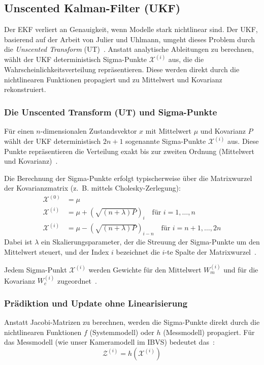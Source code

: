\subsection{Unscented Kalman-Filter (UKF)}
\label{subsec:UKF}
Der \ac{EKF} verliert an Genauigkeit, wenn Modelle stark nichtlinear sind. Der \ac{UKF}, basierend auf der Arbeit von Julier und Uhlmann, umgeht dieses Problem durch die \textit{Unscented Transform} (UT)~\cite{julier1997new}. Anstatt analytische Ableitungen zu berechnen, wählt der \ac{UKF} deterministisch Sigma-Punkte $\mathcal{X}^{(i)}$ aus, die die Wahrscheinlichkeitsverteilung repräsentieren. Diese werden direkt durch die nichtlinearen Funktionen propagiert und zu Mittelwert und Kovarianz rekonstruiert.

\subsubsection{Die Unscented Transform (UT) und Sigma-Punkte}
Für einen $n$-dimensionalen Zustandsvektor $x$ mit Mittelwert $\mu$ und Kovarianz $P$ wählt der UKF deterministisch $2n + 1$ sogenannte Sigma-Punkte $\mathcal{X}^{(i)}$ aus. Diese Punkte repräsentieren die Verteilung exakt bis zur zweiten Ordnung (Mittelwert und Kovarianz)~\cite{julier1997new}.

\newpage
Die Berechnung der Sigma-Punkte erfolgt typischerweise über die Matrixwurzel der Kovarianzmatrix (z.~B. mittels Cholesky-Zerlegung):
\begin{align}
    \mathcal{X}^{(0)} &= \mu \\
    \mathcal{X}^{(i)} &= \mu + \left( \sqrt{(n + \lambda) P} \right)_i \quad \text{für } i = 1, \dots, n \\
    \mathcal{X}^{(i)} &= \mu - \left( \sqrt{(n + \lambda) P} \right)_{i-n} \quad \text{für } i = n+1, \dots, 2n
\end{align}
Dabei ist $\lambda$ ein Skalierungsparameter, der die Streuung der Sigma-Punkte um den Mittelwert steuert, und der Index $i$ bezeichnet die $i$-te Spalte der Matrixwurzel~\cite{julier1997new}.

Jedem Sigma-Punkt $\mathcal{X}^{(i)}$ werden Gewichte für den Mittelwert $W_m^{(i)}$ und für die Kovarianz $W_c^{(i)}$ zugeordnet~\cite{julier1997new}.

\subsubsection{Prädiktion und Update ohne Linearisierung}
Anstatt Jacobi-Matrizen zu berechnen, werden die Sigma-Punkte direkt durch die nichtlinearen Funktionen $f$ (Systemmodell) oder $h$ (Messmodell) propagiert. Für das Messmodell (wie unser Kameramodell im IBVS) bedeutet das~\cite{julier1997new}:
\begin{equation}
    \mathcal{Z}^{(i)} = h(\mathcal{X}^{(i)})
\end{equation}

